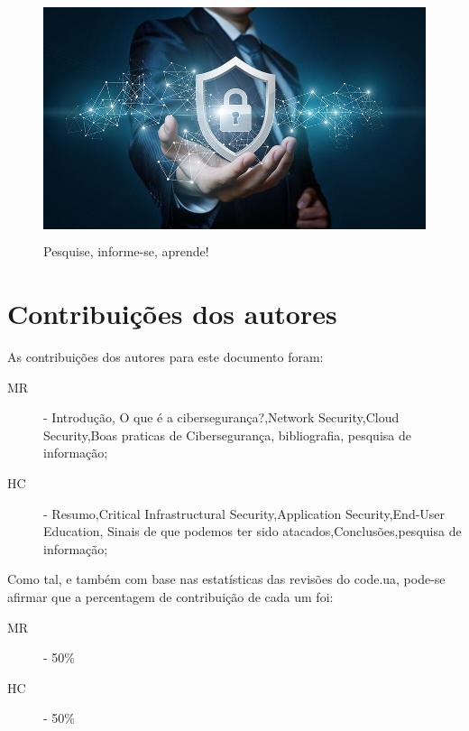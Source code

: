 \documentclass{report}
\begin{document}
{\begin{figure}[hp]
    \center 
    \includegraphics[height=200pt]{ciberseguranca-2.jpeg}
    \caption{Pesquise, informe-se, aprende!}
    \label{fig:Figura4logo.1}
\end{figure}


\chapter*{Contribuições dos autores}

As contribuições dos autores para este documento foram:

\begin{description}
	\item[\ac{MR}] - Introdução, O que é a cibersegurança?,Network Security,Cloud Security,Boas praticas de Cibersegurança, bibliografia, pesquisa de informação;
	\item[\ac{HC}] - Resumo,Critical Infrastructural Security,Application Security,End-User Education, Sinais de que podemos ter sido atacados,Conclusões,pesquisa de informação;
\end{description}

Como tal, e também com base nas estatísticas das revisões do code.ua, pode-se afirmar que a percentagem de contribuição de cada um foi:

\begin{description}
	\item[\ac{MR}] - 50\%
	\item[\ac{HC}] - 50\%
\end{description}

}
\end{document}
